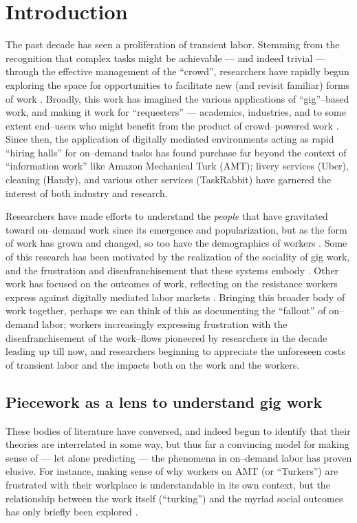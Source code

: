 \documentclass[trackingWork]{subfiles}
\begin{document}
\section{Introduction}
The past decade has seen a proliferation of transient labor.
Stemming from the recognition that
complex tasks might be achievable
--- and indeed trivial ---
through the effective management of the ``crowd'',
researchers have rapidly begun exploring
the space for opportunities to facilitate new (and revisit familiar) forms of work
\cite{bernsteinSoylent,redballoon}.
Broadly, this work has imagined the various applications of ``gig''--based work,
and making it work for ``requesters''
--- academics, industries, and to some extent end--users
who might benefit from the product of crowd--powered work
\cite{hong2015group,jonBrelig,paolacci2010running}.
Since then,
the application of digitally mediated environments acting as rapid ``hiring halls''
for on--demand tasks
has found purchase far beyond the context of ``information work'' like Amazon Mechanical Turk (AMT);
livery services (Uber), cleaning (Handy), and various other services (TaskRabbit)
have garnered the interest of both industry and research.

Researchers have made efforts to understand the \textit{people} that have gravitated toward on--demand work
since its emergence and popularization,
but as the form of work has grown and changed, so too have the demographics of workers
\cite{Ross,whoareNOTtheTurkers}.
Some of this research has been motivated by the realization of the sociality of gig work,
and the frustration and disenfranchisement that these systems embody
\cite{turkopticon,dynamo}.
Other work has focused on the outcomes of work,
reflecting on the resistance workers express against digitally mediated labor markets
\cite{uberAlgorithm}.
Bringing this broader body of work together, perhaps we can think of this as documenting the ``fallout'' of on--demand labor;
workers increasingly expressing frustration with the disenfranchisement of the work--flows pioneered by researchers in the decade leading up till now,
and researchers beginning to appreciate the unforeseen costs of transient labor and the impacts both on the work and the workers.

\subsection{Piecework as a lens to understand gig work}
These bodies of literature have conversed,
and indeed begun to identify that their theories are interrelated in some way,
but thus far a convincing model for making sense of
--- let alone predicting ---
the phenomena in on--demand labor has proven elusive.
For instance, 
making sense of why workers on AMT (or ``Turkers'') are frustrated with their workplace
is understandable in its own context, but
the relationship between the work itself (``turking'')
and the myriad social outcomes has only briefly been explored
\cite{crowdcollab}.
\end{document}

